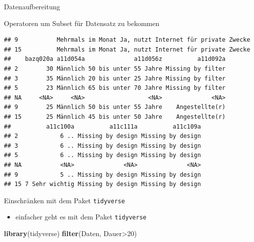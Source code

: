\documentclass[ignorenonframetext,]{beamer}
\newenvironment{Shaded}{}{}
\newcommand{\KeywordTok}[1]{\textcolor[rgb]{0.00,0.44,0.13}{\textbf{{#1}}}}
\newcommand{\DecValTok}[1]{\textcolor[rgb]{0.25,0.63,0.44}{{#1}}}
\newcommand{\NormalTok}[1]{{#1}}
\providecommand{\tightlist}{%
\setlength{\itemsep}{0pt}\setlength{\parskip}{0pt}}
\begin{document}
\begin{frame}[fragile]{Datenaufbereitung}
\begin{block}{Operatoren um Subset für Datensatz zu bekommen}
\begin{verbatim}
## 9           Mehrmals im Monat Ja, nutzt Internet für private Zwecke
## 15          Mehrmals im Monat Ja, nutzt Internet für private Zwecke
##    bazq020a a11d054a              a11d056z          a11d092a
## 2        30 Männlich 50 bis unter 55 Jahre Missing by filter
## 3        35 Männlich 20 bis unter 25 Jahre Missing by filter
## 5        23 Männlich 65 bis unter 70 Jahre Missing by filter
## NA     <NA>     <NA>                  <NA>              <NA>
## 9        25 Männlich 50 bis unter 55 Jahre    Angestellte(r)
## 15       25 Männlich 45 bis unter 50 Jahre    Angestellte(r)
##          a11c100a          a11c111a          a11c109a
## 2            6 .. Missing by design Missing by design
## 3            6 .. Missing by design Missing by design
## 5            6 .. Missing by design Missing by design
## NA           <NA>              <NA>              <NA>
## 9            5 .. Missing by design Missing by design
## 15 7 Sehr wichtig Missing by design Missing by design
\end{verbatim}

\end{block}

\begin{block}{Einschränken mit dem Paket \texttt{tidyverse}}

\begin{itemize}
\tightlist
\item
  einfacher geht es mit dem Paket \texttt{tidyverse}
\end{itemize}

\begin{Shaded}
\begin{Highlighting}[]
\KeywordTok{library}\NormalTok{(tidyverse)}
\KeywordTok{filter}\NormalTok{(Daten, Dauer>}\DecValTok{20}\NormalTok{)}
\end{Highlighting}
\end{Shaded}


\end{block}
\end{frame}
\end{document}
